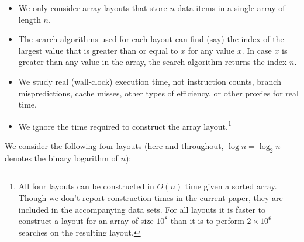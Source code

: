 \documentclass{patmorin}
\begin{document}
\begin{itemize}
\item We only consider array layouts that store $n$ data items in a
      single array of length $n$.

\item The search algorithms used for each layout can find (say) the
      index of the largest value that is greater than or equal to $x$
      for any value $x$. In case $x$ is greater than any value in the
      array, the search algorithm returns the index $n$.

\item We study real (wall-clock) execution time, not instruction counts,
      branch mispredictions, cache misses, other types of efficiency,
      or other proxies for real time.

\item We ignore the time required to construct the array
      layout.\footnote{All four layouts can be constructed in $O(n)$
      time given a sorted array.  Though we don't report construction
      times in the current paper, they are included in the accompanying
      data sets.  For all layouts it is faster to construct a layout for an
      array of size $10^8$ than it is to perform $2\times10^6$ searches
      on the resulting layout.}
\end{itemize}

We consider the following four layouts (here and throughout, $\log
n=\log_2 n$ denotes the binary logarithm of $n$):
\end{document}
